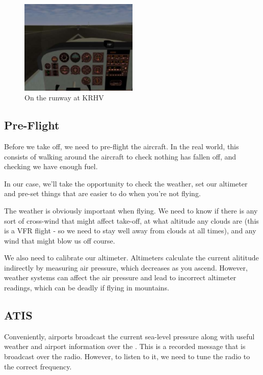 \begin{figure}[!htp]
\centering
\includegraphics[width=0.5\textwidth]{krhvrunway}
\caption{On the runway at KRHV}
\end{figure}

\subsection{Pre-Flight}

Before we take off, we need to pre-flight the aircraft. In the real world, 
this consists of walking around the aircraft to check nothing has fallen 
off, and checking we have enough fuel.

In our case, we'll take the opportunity to check the weather, set our 
altimeter and pre-set things that are easier to do when you're not flying.

The weather is obviously important when flying. We need to know if 
there is any sort of cross-wind that might affect take-off, at what 
altitude any clouds are (this is a VFR flight - so we need to stay 
well away from clouds at all times), and any wind that might blow us off course.

We also need to calibrate our altimeter. Altimeters calculate the 
current alititude indirectly by measuring air pressure, which decreases 
as you ascend. However, weather systems can affect the air pressure and 
lead to incorrect altimeter readings, which can be deadly if flying in mountains. 

\subsection{ATIS}

Conveniently, airports broadcast the current sea-level pressure along 
with useful weather and airport information over the . 
This is a recorded message that is broadcast over the radio. 
However, to listen to it, we need to tune the radio to the correct frequency.

